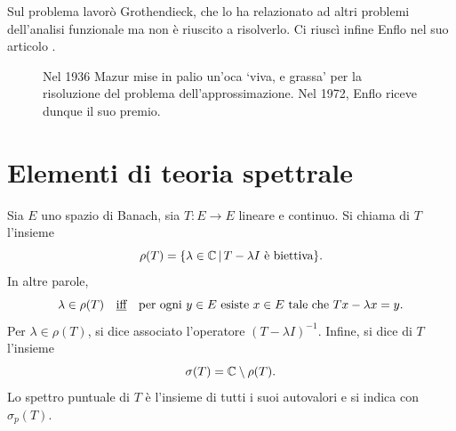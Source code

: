 Sul problema lavorò Grothendieck, che lo ha relazionato ad altri problemi dell'analisi funzionale ma non è riuscito a risolverlo. Ci riuscì infine Enflo nel suo articolo \cite{enflo1973counterexample}.

\begin{figure}[h]
	\centering
	\caption{Nel 1936 Mazur mise in palio un'oca `viva, e grassa' per la risoluzione del problema dell'approssimazione. Nel 1972, Enflo riceve dunque il suo premio.}
\end{figure}

\section{Elementi di teoria spettrale}
\begin{definition}
	Sia $E$ uno spazio di Banach, sia $T:E \to E$ lineare e continuo. Si chiama  di $T$ l'insieme
	\begin{equation*}
		\rho(T) = \{\lambda \in \mathbb{C} \,|\, \text{$T-\lambda I$ è biettiva} \}.
	\end{equation*}
	In altre parole,
	\begin{equation*}
		\lambda \in \rho(T) \quad\text{\underline{iff}}\quad \text{per ogni $y \in E$ esiste $x \in E$ tale che $Tx - \lambda x = y$}.
	\end{equation*}
	Per $\lambda \in \rho(T)$, si dice  associato l'operatore $(T-\lambda I)^{-1}$. Infine, si dice  di $T$ l'insieme
	\begin{equation*}
		\sigma(T) = \mathbb{C} \setminus \rho(T).
	\end{equation*}
	Lo spettro puntuale di $T$ è l'insieme di tutti i suoi autovalori e si indica con $\sigma_p(T)$.
\end{definition}

